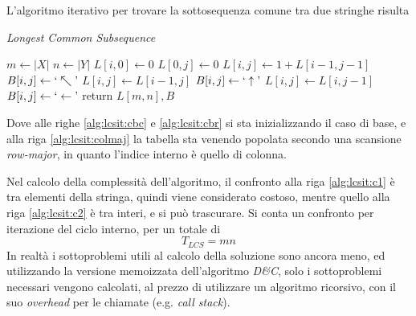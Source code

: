 L'algoritmo iterativo per trovare la sottosequenza comune tra due stringhe risulta
\begin{algorithm}[H]
\caption{\emph{Longest Common Subsequence}}\label{alg:lcsit}
\begin{algorithmic}[1]
        \State $m \gets |X|$
        \State $n \gets |Y|$
            \label{alg:lcsit:cbc}
            \State $L[i,0] \gets 0$
        \EndFor
            \label{alg:lcsit:cbr}
            \State $L[0,j] \gets 0$
        \EndFor
                \label{alg:lcsit:colmaj}
                \label{alg:lcsit:c1}
                    \State $L[i,j] \gets 1 + L[i-1,j-1]$
                    \State $B[i,j] \gets ` \nwarrow \textrm{'}$
                \Else
                    \label{alg:lcsit:c2}
                        \State $L[i,j] \gets L[i-1,j]$
                        \State $B[i,j] \gets ` \uparrow \textrm{'}$
                    \Else
                        \State $L[i,j] \gets L[i,j-1]$
                        \State $B[i,j] \gets ` \leftarrow \textrm{'}$
                    \EndIf
                \EndIf
            \EndFor
        \EndFor
        \State return $L[m,n], B$
    \EndProcedure
\end{algorithmic}
\end{algorithm}

Dove alle righe \ref{alg:lcsit:cbc} e \ref{alg:lcsit:cbr} si sta inizializzando il caso di base, e alla riga \ref{alg:lcsit:colmaj} la tabella sta venendo popolata secondo una scansione \emph{row-major}, in quanto l'indice interno è quello di colonna.

Nel calcolo della complessità dell'algoritmo, il confronto alla riga \ref{alg:lcsit:c1} è tra elementi della stringa, quindi viene considerato costoso, mentre quello alla riga \ref{alg:lcsit:c2} è tra interi, e si può trascurare. Si conta un confronto per iterazione del ciclo interno, per un totale di 
\begin{equation*}
    T_{LCS} = mn
\end{equation*}
In realtà i sottoproblemi utili al calcolo della soluzione sono ancora meno, ed utilizzando la versione memoizzata dell'algoritmo \emph{D\&C}, solo i sottoproblemi necessari vengono calcolati, al prezzo di utilizzare un algoritmo ricorsivo, con il suo \emph{overhead} per le chiamate (e.g. \textit{call stack}).

